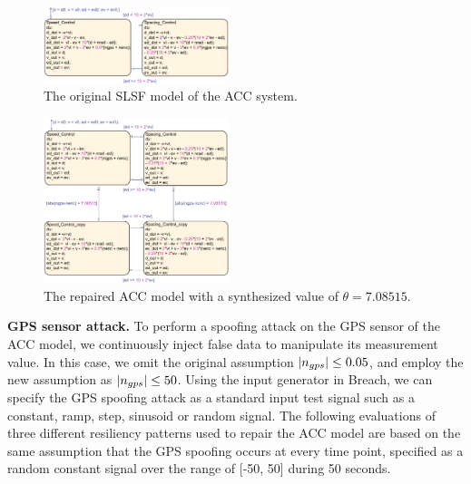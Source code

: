 
\begin{figure}[t!]%
	\centering%
    \includegraphics[width=0.48\textwidth]{image/acc_slsf_model}%
	\caption{The original SLSF model of the ACC system.}%
	\vspace{-1em}
\end{figure}%

\begin{figure}[t!]%
	\centering%
    \includegraphics[width=0.48\textwidth]{image/acc_model_pat1}%
	\caption{The repaired ACC model with a synthesized value of $\theta = 7.08515$.}%
	\vspace{-1em}
\end{figure}%

\vspace{0.5em}
\noindent
{\bf GPS sensor attack.} To perform a spoofing attack on the GPS sensor of the  ACC model, we continuously inject false data to manipulate its measurement value. In this case, we omit the original assumption $|n_{gps}| \leq 0.05$, and employ the new assumption as $|n_{gps}| \leq 50$. Using the input generator in Breach, we can specify the GPS spoofing attack as a standard input test signal such as a constant, ramp, step, sinusoid or random signal. The following evaluations of three different resiliency patterns used to repair the ACC model are based on the same assumption that the GPS spoofing occurs at every time point, specified as a random constant signal over the range of [-50, 50] during 50 seconds.

